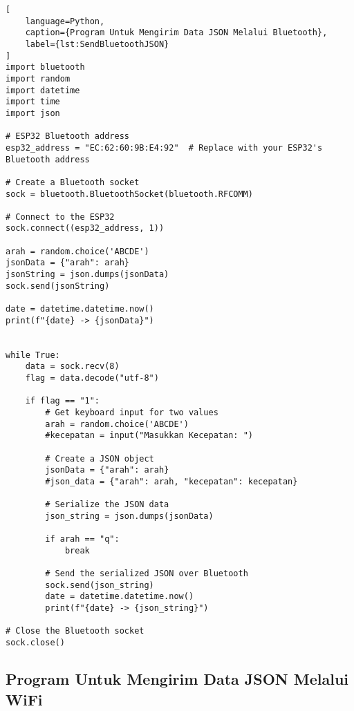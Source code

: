 \begin{lstlisting}[
    language=Python,
    caption={Program Untuk Mengirim Data JSON Melalui Bluetooth},
    label={lst:SendBluetoothJSON}
]
import bluetooth
import random
import datetime
import time
import json

# ESP32 Bluetooth address
esp32_address = "EC:62:60:9B:E4:92"  # Replace with your ESP32's Bluetooth address

# Create a Bluetooth socket
sock = bluetooth.BluetoothSocket(bluetooth.RFCOMM)

# Connect to the ESP32
sock.connect((esp32_address, 1))

arah = random.choice('ABCDE')
jsonData = {"arah": arah}
jsonString = json.dumps(jsonData)
sock.send(jsonString)

date = datetime.datetime.now()
print(f"{date} -> {jsonData}")


while True:
    data = sock.recv(8)
    flag = data.decode("utf-8")
    
    if flag == "1":
        # Get keyboard input for two values
        arah = random.choice('ABCDE')
        #kecepatan = input("Masukkan Kecepatan: ")

        # Create a JSON object
        jsonData = {"arah": arah}
        #json_data = {"arah": arah, "kecepatan": kecepatan}

        # Serialize the JSON data
        json_string = json.dumps(jsonData)

        if arah == "q":
            break

        # Send the serialized JSON over Bluetooth
        sock.send(json_string)
        date = datetime.datetime.now()
        print(f"{date} -> {json_string}")

# Close the Bluetooth socket
sock.close()
\end{lstlisting}

\subsection*{Program Untuk Mengirim Data JSON Melalui WiFi}

